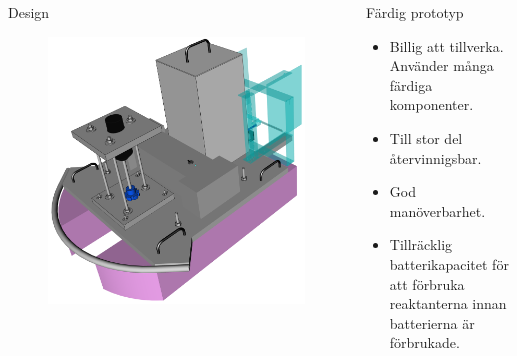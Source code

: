 \documentclass[final]{beamer}
\newlength{\onecolwid}
\begin{document}
\begin{frame}[t]
\begin{columns}[t, totalwidth=\textwidth]
\begin{column}{\onecolwid}
\begin{block}{Design}
        \begin{figure}[H]
          \centering
          \hbox{\hspace{4.5cm}\includegraphics[width=33cm]{figures/front_box_off.png}}
        \end{figure}

      \end{block}

    \end{column}
    \begin{column}{\onecolwid}

      \begin{block}{Färdig prototyp}
        \begin{itemize}
        \item Billig att tillverka. Använder många färdiga komponenter.
        \item Till stor del återvinnigsbar.
        \item God manöverbarhet.
          \item Tillräcklig batterikapacitet för att förbruka reaktanterna innan batterierna är förbrukade.
        \end{itemize}

      \end{block}


\end{column}
\end{columns}
\end{frame}
\end{document}
